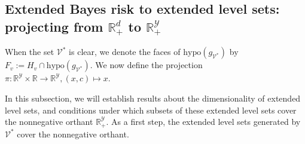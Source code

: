 \documentclass[11pt]{article}
\newcommand{\Comments}{1}
\newcommand{\mynote}[2]{\ifnum\Comments=1\textcolor{#1}{#2}\fi}
\newcommand{\mytodo}[2]{\ifnum\Comments=1%
  \todo[linecolor=#1!80!black,backgroundcolor=#1,bordercolor=#1!80!black]{#2}\fi}
\newcommand{\jessie}[1]{\mynote{teal}{[JF: #1]}}
\newcommand{\jessiet}[1]{\mytodo{teal!20!white}{JF: #1}}
\newcommand{\reals}{\mathbb{R}}
\newcommand{\V}{\mathcal{V}}
\newcommand{\Y}{\mathcal{Y}}
\newcommand{\inprod}[2]{\langle #1, #2 \rangle}%
\newcommand{\hyp}{\mathrm{hypo}}
\DeclareMathOperator*{\argmin}{arg\,min}
\newtheorem{claim}{Claim}
\begin{document}



\subsection{Extended Bayes risk to extended level sets: projecting from $\reals^d_+$ to $\reals^\Y_+$}\label{subsec:project-pi}

When the set $\V^*$ is clear, we denote the faces of $\hyp(g_{\V^*})$ by $F_v := H_v \cap \hyp(g_{\V^*})$.
We now define the projection $\pi:\reals^\Y\times \reals \to \reals^\Y, (x,c) \mapsto x$.


In this subsection, we will establish results about the dimensionality of extended level sets, and conditions under which subsets of these extended level sets cover the nonnegative orthant $\reals^\Y_+$.
As a first step, the extended level sets generated by $\V^*$ cover the nonnegative orthant.
\end{document}
